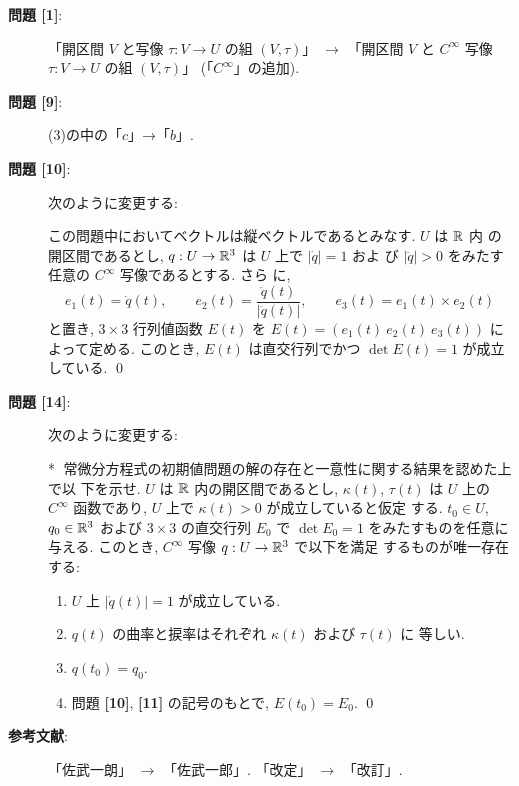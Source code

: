 \documentclass[12pt,twoside]{jarticle}
\def\qstar#1{$\!\!\!$#1$\;$}
\begin{document}
\begin{description}

\item[{\bf 問題 [1]}:] %
「開区間 $V$ と写像 $\tau : V \to U$ の組 $(V, \tau)$」 $\rightarrow$ %
「開区間 $V$ と $C^\infty$ 写像 $\tau : V \to U$ の組 $(V, \tau)$」 %
(「$C^\infty$」の追加).

\item[{\bf 問題 [9]}:] (3)の中の「$c$」→「$b$」.

\item[{\bf 問題 [10]}:] 次のように変更する:

\noindent{\bf [10]}\enspace
  この問題中においてベクトルは縦ベクトルであるとみなす. $U$ は ${\mathbb R}$ 内
  の開区間であるとし, $q : U \to {\mathbb R}^3$ は $U$ 上で $|\dot{q}| = 1$ およ
  び $|\ddot{q}| > 0$ をみたす任意の $C^\infty$ 写像であるとする. さら
  に, 
  \[
    e_1(t) = \dot{q}(t),
    \qquad
    e_2(t) = \frac{\ddot{q}(t)}{|\ddot{q}(t)|},
    \qquad
    e_3(t) = e_1(t) \times e_2(t)
  \]%
  と置き, $3\times 3$ 行列値函数 $E(t)$ を %
  $E(t) = (e_1(t)\ e_2(t)\ e_3(t))$ によって定める. このとき, $E(t)$ %
  は直交行列でかつ $\det E(t) = 1$ が成立している. \qed

\item[{\bf 問題 [14]}:] 次のように変更する:

\enspace\qstar{*}
  常微分方程式の初期値問題の解の存在と一意性に関する結果を認めた上で以
  下を示せ. %
  $U$ は ${\mathbb R}$ 内の開区間であるとし, $\kappa(t)$, $\tau(t)$ は $U$ 上の
  $C^\infty$ 函数であり, $U$ 上で $\kappa(t) > 0$ が成立していると仮定
  する. $t_0 \in U$, $q_0 \in {\mathbb R}^3$ および $3 \times 3$ の直交行列 %
  $E_0$ で $\det E_0 = 1$ をみたすものを任意に与える. このとき, 
  $C^\infty$ 写像 $q : U \to {\mathbb R}^3$ で以下を満足
  するものが唯一存在する:
  \begin{enumerate}
  \item $U$ 上 $|\dot{q}(t)| = 1$ が成立している.
  \item $q(t)$ の曲率と捩率はそれぞれ $\kappa(t)$ および $\tau(t)$ に
    等しい.
  \item $q(t_0) = q_0$.
  \item 問題 {\bf [10]}, {\bf [11]} の記号のもとで, $E(t_0) = E_0$.
  \qed
  \end{enumerate}

\item[{\bf 参考文献}:] 「佐武一朗」 $\rightarrow$ 「佐武一郎」. 
「改定」 $\rightarrow$ 「改訂」.

\end{description}
\end{document}

